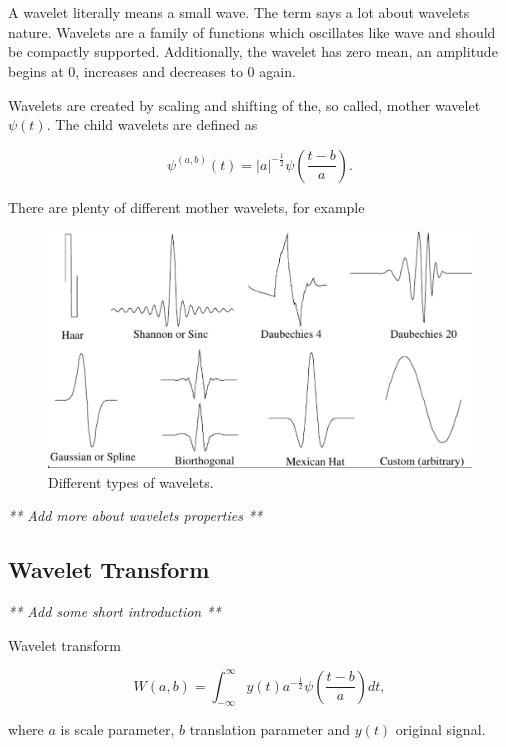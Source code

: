 \chapter{}
A wavelet literally means a small wave. The term says a lot about wavelets nature. Wavelets are a family of functions which oscillates like wave and should be compactly supported. Additionally, the wavelet has zero mean, an amplitude begins at 0, increases and decreases to 0 again.

\begin{defn}
Wavelets are created by scaling and shifting of the, so called, mother wavelet $\psi(t)$. The child wavelets are defined as

\begin{equation}
\label{eq:wavelets}
\psi^{(a,b)}(t)=|a|^{-\frac{1}{2}} \psi\left(\frac{t-b}{a}\right). 
\end{equation}

\end{defn}


There are plenty of different mother wavelets, for example

\begin{figure}[h]
	\centering
	\includegraphics[width=\textwidth]{wavelets_with_bottom_line.png}
	\caption{Different types of wavelets.}
	\label{fig:wavelets}
\end{figure}

\textit{** Add more about wavelets properties **}

\section{Wavelet Transform}

\textit{** Add some short introduction **}

\begin{defn}
Wavelet transform

\begin{equation}
W(a,b)=\int_{-\infty}^{\infty} y(t) a^{-\frac{1}{2}} \psi\left(\frac{t-b}{a}\right) dt,
\end{equation}

where $a$ is scale parameter, $b$ translation parameter and $y(t)$ original signal.
\end{defn}


